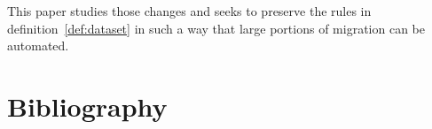 \documentclass{elsarticle}
\begin{document}
	This paper studies those changes and seeks to preserve the rules in definition~\ref{def:dataset}
	in such a way that large portions of migration can be automated.


\section{Bibliography}


\end{document}
